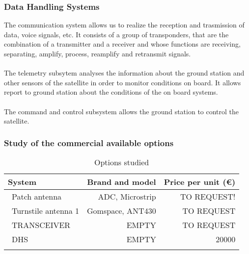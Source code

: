 \subsubsection{Data Handling Systems}

The communication system allows us to realize the reception and trasmission of data, voice signals, etc. It consists of a group of transponders, that are the combination of a transmitter and a receiver and whose functions are receiving, separating, amplify, process, reamplify and retransmit signals.
	\paragraph{} 
	The telemetry subsytem analyses the information about the ground station and other sensors of the satellite in 	order to monitor conditions on board. It allows report to ground station about the conditions of the on board 			systems.
	\paragraph{} 
	The command and control subsystem allows the ground station to control the satellite.

\subsubsection{Study of the commercial available options}


\begin{longtable}{| l | r | r | }
	\hline
	\rowcolor[gray]{0.80}	\textbf{System} &  \textbf{Brand and model}     & \textbf{Price per unit (\euro)}   \\
	\hline
	\endfirsthead
	
	~Patch antenna & ADC, Microstrip & TO REQUEST! \\
	~Turnstile antenna 1 & Gomspace, ANT430 & TO REQUEST \\
	~TRANSCEIVER & EMPTY & TO REQUEST \\
	~DHS & EMPTY & 20000 \\
	\hline
	
	\caption{Options studied}
	\label{payloadoptionstable}
\end{longtable}

